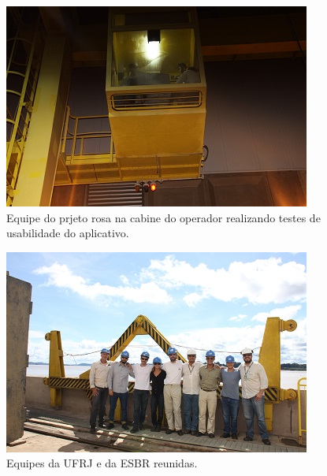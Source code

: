 \begin{figure}[h!]
  \centering
  \includegraphics[width=1\linewidth]{Fotos/Janeiro2015/20.JPG}
  \caption{Equipe do prjeto rosa na cabine do operador realizando testes de usabilidade do aplicativo.}
  \label{nov20134}
\end{figure}

\begin{figure}[h!]
  \centering
  \includegraphics[width=1\linewidth]{Fotos/Janeiro2015/23.JPG}
  \caption{Equipes da UFRJ e da ESBR reunidas.}
  \label{nov20134}
\end{figure}

